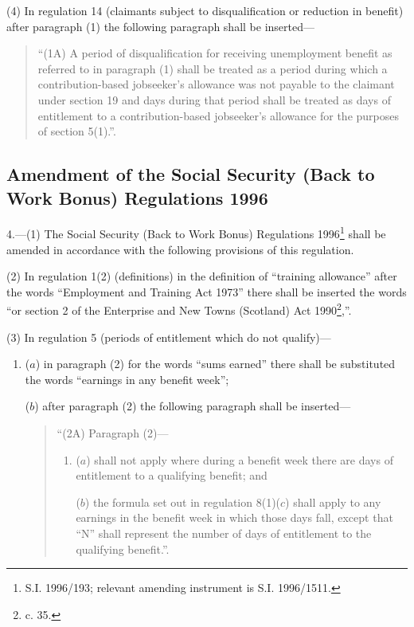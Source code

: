 \documentclass[a4paper]{article}
\begin{document}
(4) In regulation 14 (claimants subject to disqualification or reduction in benefit) after paragraph (1) the following paragraph shall be inserted—
\begin{quotation}
“(1A) A period of disqualification for receiving unemployment benefit as referred to in paragraph (1) shall be treated as a period during which a contribution-based jobseeker’s allowance was not payable to the claimant under section 19 and days during that period shall be treated as days of entitlement to a contribution-based jobseeker’s allowance for the purposes of section 5(1).”.
\end{quotation}

\subsection[4. Amendment of the Social Security (Back to Work Bonus) Regulations 1996]{Amendment of the Social Security (Back to Work Bonus) Regulations 1996}

4.—(1) The Social Security (Back to Work Bonus) Regulations 1996\footnote{\frenchspacing S.I. 1996/193; relevant amending instrument is S.I. 1996/1511.} shall be amended in accordance with the following provisions of this regulation.

(2) In regulation 1(2) (definitions) in the definition of “training allowance” after the words “Employment and Training Act 1973” there shall be inserted the words “or section 2 of the Enterprise and New Towns (Scotland) Act 1990\footnote{ c. 35.},”.

(3) In regulation 5 (periods of entitlement which do not qualify)—
\begin{enumerate}\item[]
($a$) in paragraph (2) for the words “sums earned” there shall be substituted the words “earnings in any benefit week”;

($b$) after paragraph (2) the following paragraph shall be inserted—
\begin{quotation}
“(2A) Paragraph (2)—
\begin{enumerate}\item[]
($a$) shall not apply where during a benefit week there are days of entitlement to a qualifying benefit; and

($b$) the formula set out in regulation 8(1)($c$) shall apply to any earnings in the benefit week in which those days fall, except that “N” shall represent the number of days of entitlement to the qualifying benefit.”.
\end{enumerate}
\end{quotation}
\end{enumerate}
\end{document}
